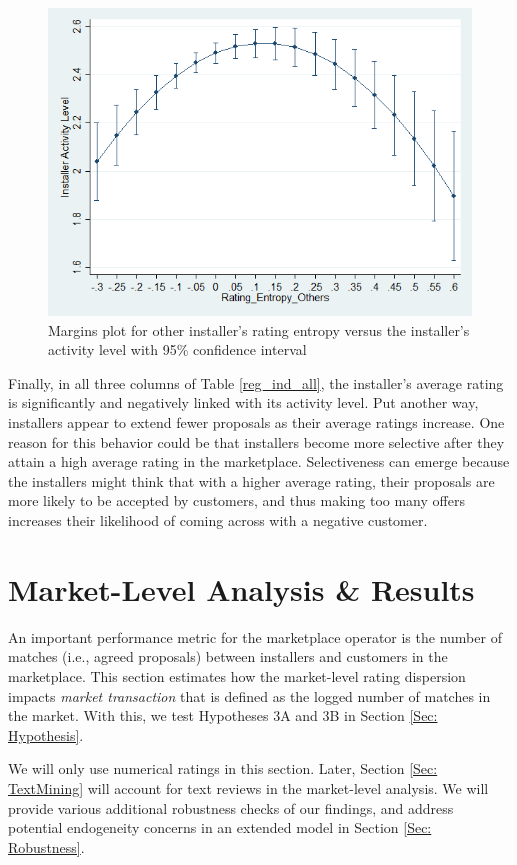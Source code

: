 \documentclass[msom,blindrev]{informs3}
\begin{document}
	\begin{figure}
		\centering
		\includegraphics[width=0.7\linewidth]{marginsplot_entothers.png}
		\caption{Margins plot for other installer's rating entropy versus the installer's activity level with 95\% confidence interval}
		\label{fig: marginsplot_ind_ent_others}
	\end{figure}
	
	
	
	
	
	Finally, in all three columns of Table \ref{reg_ind_all}, the installer's average rating is significantly and negatively linked with its activity level. Put another way, installers appear to extend fewer proposals as their average ratings increase. One reason for this behavior could be that  installers become more selective after they attain a high average rating in the marketplace. Selectiveness can emerge because the installers might think that with a higher average rating, their proposals are more likely to be accepted by customers, and thus making too many offers increases their likelihood of coming across with a negative customer.
	
	\section{Market-Level Analysis \& Results} \label{Sec: Market-level}
	
	An important performance metric for the marketplace operator is the number of matches (i.e., agreed proposals) between installers and customers in the marketplace. This section estimates how the market-level rating dispersion impacts \emph{market transaction} that is defined as the logged number of matches in the market. With this, we test Hypotheses 3A and 3B in Section \ref{Sec: Hypothesis}.
	
	We will only use numerical ratings in this section. Later, Section \ref{Sec: TextMining} will account for text reviews in the market-level analysis. We will provide various additional robustness checks of our findings, and address potential endogeneity concerns in an extended model in Section \ref{Sec: Robustness}.
	
\end{document}
